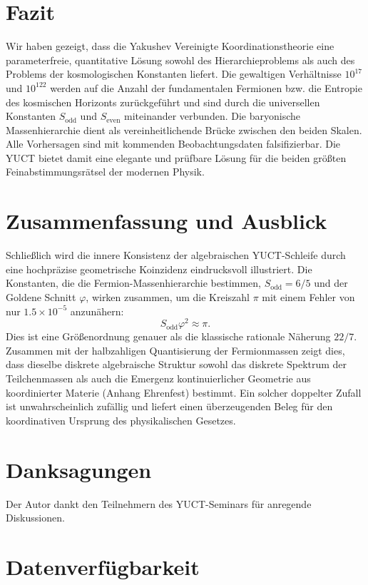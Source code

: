 \documentclass[11pt,a4paper]{article}
\theoremstyle{remark}
\begin{document}
	\section{Fazit}
	
	Wir haben gezeigt, dass die Yakushev Vereinigte Koordinationstheorie eine parameterfreie, quantitative Lösung sowohl des Hierarchieproblems als auch des Problems der kosmologischen Konstanten liefert. Die gewaltigen Verhältnisse \(10^{17}\) und \(10^{122}\) werden auf die Anzahl der fundamentalen Fermionen bzw. die Entropie des kosmischen Horizonts zurückgeführt und sind durch die universellen Konstanten \(S_{\mathrm{odd}}\) und \(S_{\mathrm{even}}\) miteinander verbunden. Die baryonische Massenhierarchie dient als vereinheitlichende Brücke zwischen den beiden Skalen. Alle Vorhersagen sind mit kommenden Beobachtungsdaten falsifizierbar. Die YUCT bietet damit eine elegante und prüfbare Lösung für die beiden größten Feinabstimmungsrätsel der modernen Physik.
	
	\section*{Zusammenfassung und Ausblick}
	
	Schließlich wird die innere Konsistenz der algebraischen YUCT-Schleife durch eine hochpräzise geometrische Koinzidenz eindrucksvoll illustriert. Die Konstanten, die die Fermion-Massenhierarchie bestimmen, \(S_{\mathrm{odd}}=6/5\) und der Goldene Schnitt \(\varphi\), wirken zusammen, um die Kreiszahl \(\pi\) mit einem Fehler von nur \(1.5\times10^{-5}\) anzunähern:
	\[
	S_{\mathrm{odd}}\varphi^2 \approx \pi .
	\]
	Dies ist eine Größenordnung genauer als die klassische rationale Näherung \(22/7\). Zusammen mit der halbzahligen Quantisierung der Fermionmassen zeigt dies, dass dieselbe diskrete algebraische Struktur sowohl das diskrete Spektrum der Teilchenmassen als auch die Emergenz kontinuierlicher Geometrie aus koordinierter Materie (Anhang Ehrenfest) bestimmt. Ein solcher doppelter Zufall ist unwahrscheinlich zufällig und liefert einen überzeugenden Beleg für den koordinativen Ursprung des physikalischen Gesetzes.
	
	\section*{Danksagungen}
	
	Der Autor dankt den Teilnehmern des YUCT-Seminars für anregende Diskussionen.
	
	\section*{Datenverfügbarkeit}
	
\end{document}
